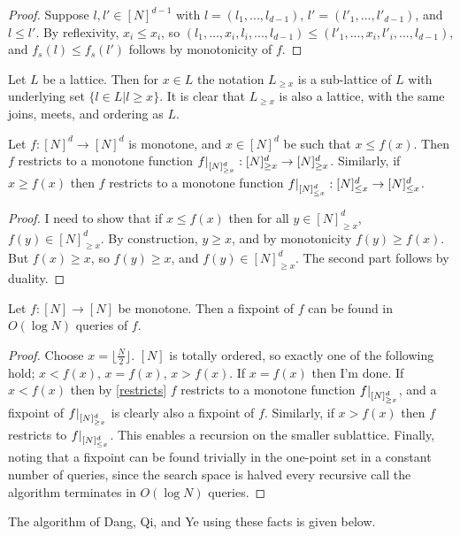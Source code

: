 \begin{proof}
  Suppose $l, l' \in [N]^{d-1}$ with $l = (l_1, ..., l_{d-1})$, $l' = (l'_1, ..., l'_{d-1})$, and $l \leq l'$.
  By reflexivity, $x_i \leq x_i$, so $(l_1, ... , x_i, l_i, ..., l_{d-1}) \leq (l'_1, ... , x_i, l'_i, ..., l_{d-1})$,
  and $f_s(l) \leq f_s(l')$ follows by monotonicity of $f$.
\end{proof}
\begin{notation}
  Let $L$ be a lattice. Then for $x \in L$ the notation $L_{\geq x}$ is a sub-lattice of $L$ with underlying set
  $\{l \in L | l \geq x\}$. It is clear that $L_{\geq x}$ is also a lattice, with the same joins, meets, and ordering as $L$.
\end{notation}
\begin{lemma}\label{restricts}
  Let $f : [N]^d \to [N]^d$ is monotone, and $x \in [N]^d$ be such that $x \leq f(x)$. Then
  $f$ restricts to a monotone function $\restr{f}{[N]^d_{\geq x}} : [N]^d_{\geq x} \to [N]^d_{\geq x}$. Similarly,
  if $x \geq f(x)$ then $f$ restricts to a monotone function $\restr{f}{[N]^d_{\leq x}} : [N]^d_{\leq x} \to [N]^d_{\leq x}$.
\end{lemma}
\begin{proof}
  I need to show that if $x \leq f(x)$ then for all $y \in [N]^d_{\geq x}$, $f(y) \in [N]^d_{\geq x}$. By construction,
  $y \geq x$, and by monotonicity $f(y) \geq f(x)$. But $f(x) \geq x$, so $f(y) \geq x$, and $f(y) \in [N]^d_{\geq x}$. The second part
  follows by duality.
\end{proof}
\begin{lemma}
  Let $f : [N] \to [N]$ be monotone. Then a fixpoint of $f$ can be found in $O(\log N)$ queries of $f$.
\end{lemma}
\begin{proof}
  Choose $x = \lfloor \frac{N}{2} \rfloor$. $[N]$ is totally ordered, so exactly one of the following hold; $x < f(x)$, $x = f(x)$, $x > f(x)$.
  If $x = f(x)$ then I'm done. If $x < f(x)$ then by \cref{restricts} $f$ restricts to a monotone function $\restr{f}{[N]^d_{\geq x}}$, 
  and a fixpoint of $\restr{f}{[N]^d_{\geq x}}$ is clearly also a fixpoint of $f$. Similarly, if $x > f(x)$ then $f$ restricts to
  $\restr{f}{[N]^d_{\leq x}}$. This enables a recursion on the smaller sublattice. Finally,
  noting that a fixpoint can be found trivially in the one-point set in a constant number of queries,
  since the search space is halved every recursive call
  the algorithm terminates in $O(\log N)$ queries.
\end{proof}
The algorithm of Dang, Qi, and Ye using these facts is given below.

